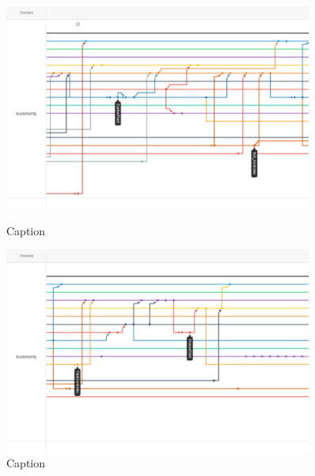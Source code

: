 \begin{figure}
    \includegraphics[width=0.9\textwidth]{Report/root/7.png}
    \caption{Caption}
    \includegraphics[width=0.9\textwidth]{Report/root/8.png}
    \caption{Caption}
    \end{figure}

